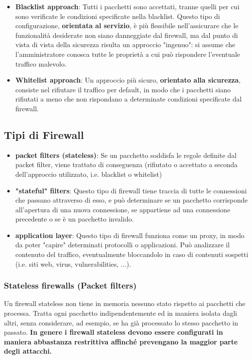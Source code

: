\begin{itemize}
\item \textbf{Blacklist approach}: Tutti i pacchetti sono accettati, tranne quelli per cui sono verificate le condizioni specificate nella blacklist. Questo tipo di configurazione, \textbf{orientata al servizio}, è più flessibile nell'assicurare che le funzionalità desiderate non siano danneggiate dal firewall, ma dal punto di vista di vista della sicurezza risulta un approccio "ingenuo": si assume che l'amministratore conosca tutte le proprietà a cui può rispondere l'eventuale traffico malevolo.

\item \textbf{Whitelist approach}: Un approccio più sicuro, \textbf{orientato alla sicurezza}, consiste nel rifiutare il traffico per default, in modo che i pacchetti siano rifiutati a meno che non rispondano a determinate condizioni specificate dal firewall. 
\end{itemize}

\subsection{Tipi di Firewall}
\begin{itemize}
\item \textbf{packet filters (stateless)}: Se un pacchetto soddisfa le regole definite dal packet filter, viene trattato di conseguenza (rifiutato o accettato a seconda dell'approccio utilizzato, i.e. blacklist o whitelist)
\item \textbf{"stateful" filters}: Questo tipo di firewall tiene traccia di tutte le connessioni che passano attraverso di esso, e può determinare se un pacchetto corrisponde all'apertura di una nuova connessione, se appartiene ad una connessione precedente o se è un pacchetto invalido.
\item \textbf{application layer}: Questo tipo di firewall funziona come un proxy, in modo da poter "capire" determinati protocolli o applicazioni. Può analizzare il contenuto del traffico, eventualmente bloccandolo in caso di contenuti sospetti (i.e. siti web, virus, vulnerabilities, ...).
\end{itemize}
\subsubsection{Stateless firewalls (Packet filters)}
Un firewall stateless non tiene in memoria nessuno stato rispetto ai pacchetti che processa. Tratta ogni pacchetto indipendentemente ed in maniera isolata dagli altri, senza considerare, ad esempio, se ha già processato lo stesso pacchetto in passato. \textbf{In genere i firewall stateless devono essere configurati in maniera abbastanza restrittiva affinché prevengano la maggior parte degli attacchi.}

